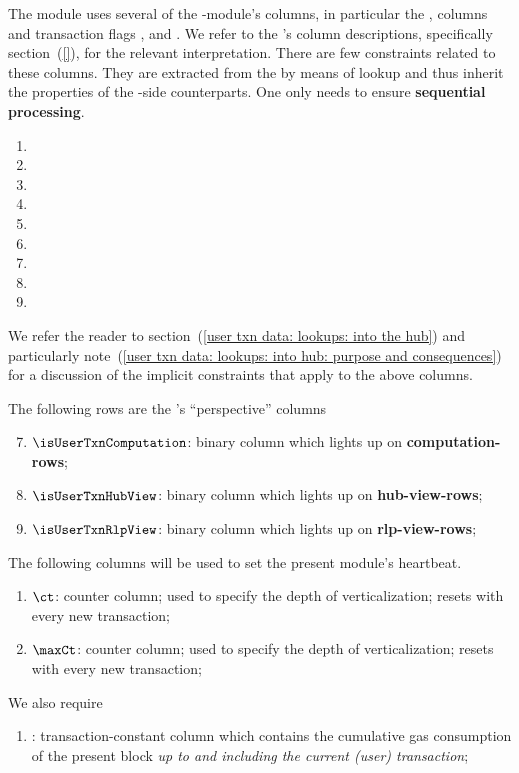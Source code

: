 The \txnDataMod{} module uses several of the \hubMod{}-module's columns, in particular
the \totalTransactionNumber{}, \userTransactionNumber{} columns and transaction flags \sysi{}, \user{} and \sysf{}.
We refer to the \hubMod{}'s column descriptions,
specifically section~(\ref{}),
for the relevant interpretation.
There are few constraints related to these columns.
They are extracted from the \hubMod{} by means of lookup and thus inherit the properties of the \hubMod{}-side counterparts.
One only needs to ensure \textbf{sequential processing}.
\begin{multicols}{3}
	\begin{enumerate}
		\item \blockNumber
		\item \totalTransactionNumber
		\item[\vspace{\fill}]
		\item \sysiTransactionNumber
		\item \userTransactionNumber
		\item \sysfTransactionNumber
		\item \sysi
		\item \user
		\item \sysf
	\end{enumerate}
\end{multicols}
\noindent We refer the reader to
section~(\ref{user txn data: lookups: into the hub}) and particularly
note~(\ref{user txn data: lookups: into hub: purpose and consequences})
for a discussion of the implicit constraints that apply to the above columns.

\noindent The following rows are the \txnDataMod{}'s ``perspective'' columns
\begin{enumerate}\setcounter{enumi}{6}
	\item
		$\isUserTxnComputation$:
		binary column which lights up on \textbf{computation-rows};
	\item
		$\isUserTxnHubView$:
		binary column which lights up on \textbf{hub-view-rows};
	\item
		$\isUserTxnRlpView$:
		binary column which lights up on \textbf{rlp-view-rows};
\end{enumerate}
\noindent The following columns will be used to set the present module's heartbeat.
\begin{enumerate}[resume]
	\item $\ct$:
		counter column;
		used to specify the depth of verticalization;
		resets with every new transaction; 
	\item $\maxCt$:
		counter column;
		used to specify the depth of verticalization;
		resets with every new transaction; 
\end{enumerate}
We also require
\begin{enumerate}[resume]
	\item \cumulativeConsumedGas:
		transaction-constant column which contains the cumulative gas consumption of the present block
		\emph{up to and including the current (user) transaction};
\end{enumerate}
